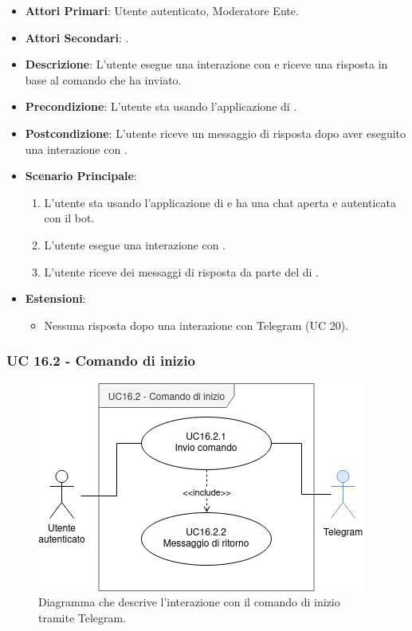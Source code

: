 	\begin{itemize}
		\item \textbf{Attori Primari}: Utente autenticato, Moderatore Ente.
		\item \textbf{Attori Secondari}: .
		\item \textbf{Descrizione}: L'utente esegue una interazione con  e riceve una risposta in base al comando che ha inviato. 
		\item \textbf{Precondizione}: L'utente sta usando l'applicazione di .
		\item \textbf{Postcondizione}: L'utente riceve un messaggio di risposta dopo aver eseguito una interazione con .
		\item \textbf{Scenario Principale}:
		\begin{enumerate}
			\item L'utente sta usando l'applicazione di  e ha una chat aperta e autenticata con il bot. 
			\item L'utente esegue una interazione con .
			\item L'utente riceve dei messaggi di risposta da parte del  di .
		\end{enumerate}
		\item \textbf{Estensioni}:
		\begin{itemize}
			\item Nessuna risposta dopo una interazione con Telegram (UC 20).
		\end{itemize}
	\end{itemize}

	\subsubsection{UC 16.2 - Comando di inizio}

	\begin{figure}[H]
		\centering
		\includegraphics[scale=0.60]{res/images/uc16.2}
		\caption{Diagramma che descrive l'interazione con il comando di inizio tramite Telegram.}
	\end{figure}

